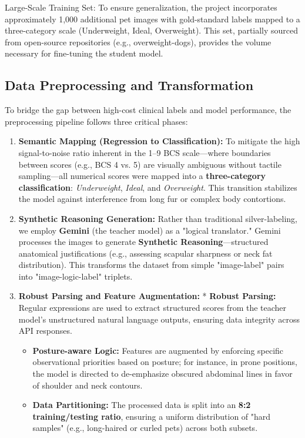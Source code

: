 \documentclass[11pt,twocolumn]{article}
\begin{document}
Large-Scale Training Set: To ensure generalization, the project incorporates approximately 1,000 additional pet images with gold-standard labels mapped to a three-category scale (Underweight, Ideal, Overweight). This set, partially sourced from open-source repositories (e.g., overweight-dogs), provides the volume necessary for fine-tuning the student model.

\subsection{Data Preprocessing and Transformation}

To bridge the gap between high-cost clinical labels and model performance, the preprocessing pipeline follows three critical phases:

\begin{enumerate}
    \item \textbf{Semantic Mapping (Regression to Classification):} To mitigate the high signal-to-noise ratio inherent in the 1–9 BCS scale—where boundaries between scores (e.g., BCS 4 vs. 5) are visually ambiguous without tactile sampling—all numerical scores were mapped into a \textbf{three-category classification}: \textit{Underweight}, \textit{Ideal}, and \textit{Overweight}. This transition stabilizes the model against interference from long fur or complex body contortions.
    \item \textbf{Synthetic Reasoning Generation:} Rather than traditional silver-labeling, we employ \textbf{Gemini} (the teacher model) as a "logical translator." Gemini processes the images to generate \textbf{Synthetic Reasoning}—structured anatomical justifications (e.g., assessing scapular sharpness or neck fat distribution). This transforms the dataset from simple "image-label" pairs into "image-logic-label" triplets.
    \item \textbf{Robust Parsing and Feature Augmentation:} * \textbf{Robust Parsing:} Regular expressions are used to extract structured scores from the teacher model’s unstructured natural language outputs, ensuring data integrity across API responses.
    \begin{itemize}
        \item \textbf{Posture-aware Logic:} Features are augmented by enforcing specific observational priorities based on posture; for instance, in prone positions, the model is directed to de-emphasize obscured abdominal lines in favor of shoulder and neck contours.
        \item \textbf{Data Partitioning:} The processed data is split into an \textbf{8:2 training/testing ratio}, ensuring a uniform distribution of "hard samples" (e.g., long-haired or curled pets) across both subsets.
    \end{itemize}
\end{enumerate}
\end{document}
